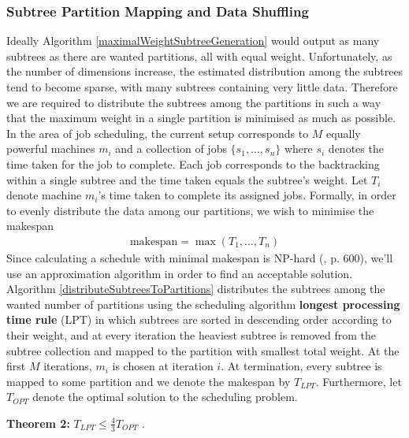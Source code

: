 \documentclass{report}
\begin{document}
\subsubsection{Subtree Partition Mapping and Data Shuffling}
{
	Ideally Algorithm \ref{maximalWeightSubtreeGeneration} would output as many subtrees as there are wanted partitions, all with equal weight. Unfortunately, as the number of dimensions increase, 
	the estimated distribution among the subtrees tend to become sparse, with many subtrees containing very little data. Therefore we are required to 
	distribute the subtrees among the partitions in such a way that the maximum weight in a single partition is minimised as much as possible. In the area of job scheduling, the current setup corresponds 
	to $M$ equally powerful machines $m_i$ and a collection of jobs $\{s_1, \dots, s_n\}$ where $s_i$ denotes the time taken for the job to complete. Each job corresponds to the backtracking within a single subtree
	and the time taken equals the subtree's weight. Let $T_i$ denote machine $m_i$'s time taken to complete its assigned jobs. Formally, in order to evenly distribute the data among our partitions, 
	we wish to minimise the makespan
	\begin{align*}
		\text{makespan} = \max(T_1,\dots,T_n)
	\end{align*}
	Since calculating a schedule with minimal makespan is NP-hard (\cite{Algorithm Design}, p. 600), we'll use an approximation algorithm in order to find an acceptable solution.
	Algorithm \ref{distributeSubtreesToPartitions} distributes the subtrees among the wanted number of partitions using the scheduling algorithm \textbf{longest processing time rule} (LPT) in which
	subtrees are sorted in descending order according to their weight, and at every iteration the heaviest subtree is removed from the subtree collection and mapped 
	to the partition with smallest total weight. At the first $M$ iterations, $m_i$ is chosen at iteration $i$. 
	At termination, every subtree is mapped to some partition and we denote the makespan by $T_{LPT}$. Furthermore, let $T_{OPT}$ denote the optimal solution to the 
	scheduling problem.\newline
}

\noindent\textbf{Theorem 2: }$T_{LPT} \leq \frac{4}{3} T_{OPT}$ .\newline
\end{document}
